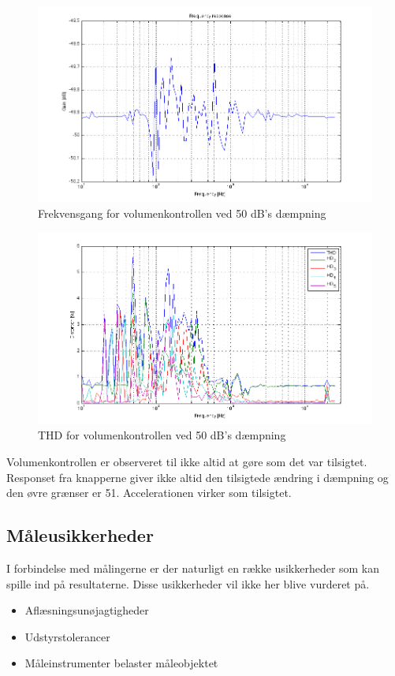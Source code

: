 \begin{figure}[h]
\centering
\includegraphics[width=\textwidth]{maalerapporter/volumenkontrol/2Vniveau50-frek.png}
\caption{Frekvensgang for volumenkontrollen ved 50 dB's dæmpning}
\end{figure}

\begin{figure}[h]
\centering
\includegraphics[width=\textwidth]{maalerapporter/volumenkontrol/2Vniveau50-thd.png}
\caption{THD for volumenkontrollen ved 50 dB's dæmpning}
\label{fig:apvold:thd50}
\end{figure}

Volumenkontrollen er observeret til ikke altid at gøre som det var tilsigtet. Responset fra knapperne giver ikke altid den tilsigtede ændring i dæmpning og den øvre grænser er 51. Accelerationen virker som tilsigtet.


\subsection*{Måleusikkerheder}
I forbindelse med målingerne er der naturligt en række usikkerheder som kan spille ind på resultaterne. Disse usikkerheder vil ikke her blive vurderet på. 

\begin{itemize}
\item Aflæsningsunøjagtigheder
\item Udstyrstolerancer
\item Måleinstrumenter belaster måleobjektet
\end{itemize}